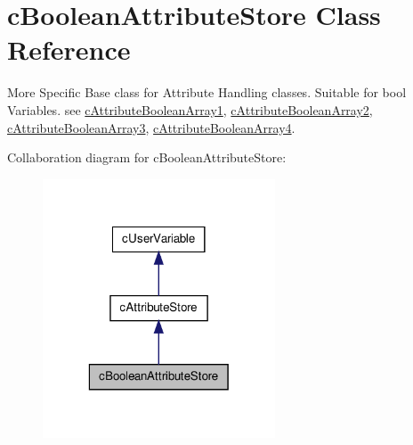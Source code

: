 \hypertarget{classc_boolean_attribute_store}{
\section{cBooleanAttributeStore Class Reference}
\label{classc_boolean_attribute_store}
}


More Specific Base class for Attribute Handling classes. Suitable for bool Variables. see \hyperlink{classc_attribute_boolean_array1}{cAttributeBooleanArray1}, \hyperlink{classc_attribute_boolean_array2}{cAttributeBooleanArray2}, \hyperlink{classc_attribute_boolean_array3}{cAttributeBooleanArray3}, \hyperlink{classc_attribute_boolean_array4}{cAttributeBooleanArray4}.  




Collaboration diagram for cBooleanAttributeStore:\nopagebreak
\begin{figure}[H]
\begin{center}
\leavevmode
\includegraphics[width=196pt]{classc_boolean_attribute_store__coll__graph}
\end{center}
\end{figure}
